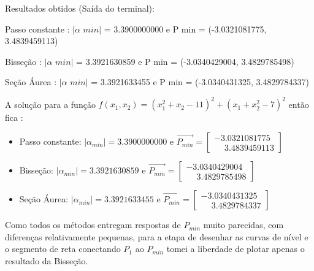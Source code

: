 \documentclass[10pt, a4paper]{article}
\begin{document}
Resultados obtidos (Saída do terminal):
\newline


Passo constante : $|\alpha \,\, min|$ = 3.3900000000 e P min = (-3.0321081775, 3.4839459113)

Bisseção        : $|\alpha \,\, min|$ = 3.3921630859 e P min = (-3.0340429004, 3.4829785498)

Seção Áurea     : $|\alpha \,\,  min|$ = 3.3921633455 e P min = (-3.0340431325, 3.4829784337)\newline

A solução para a função $f(x_1, x_2) = (x_1^2 + x_2 - 11)^2 + (x_1 + x_2^2 - 7)^2$ então fica :
\newline

\begin{itemize}
  \item Passo constante: $|\alpha_{min}| = 3.3900000000$ e $\overrightarrow{P_{min}} =  
  \begin{bmatrix}
    -3.0321081775 \\ \phantom{-}3.4839459113
  \end{bmatrix}$
  \item Bisseção: $|\alpha_{min}| = 3.3921630859$ e $\overrightarrow{P_{min}} =  
  \begin{bmatrix}
    -3.0340429004 \\ \phantom{-}3.4829785498
  \end{bmatrix}$
  \item Seção Áurea: $|\alpha_{min}| = 3.3921633455$ e $\overrightarrow{P_{min}} =  
  \begin{bmatrix}
    -3.0340431325 \\ \phantom{-}3.4829784337
  \end{bmatrix}$
\end{itemize}

Como todos os métodos entregam respostas de $P_{min}$ muito parecidas, com diferenças relativamente pequenas,
para a etapa de desenhar as curvas de nível e o segmento de reta conectando $P_1$ ao $P_{min}$ tomei a liberdade
de plotar apenas o resultado da Bisseção.
\end{document}
